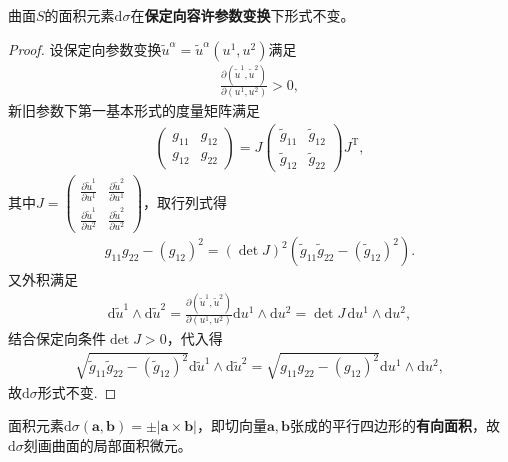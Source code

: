 \documentclass[../../main.tex]{subfiles}%
\begin{document}
\begin{proposition}
曲面$S$的面积元素$\mathrm{d}\sigma$在\textbf{保定向容许参数变换}下形式不变。
\end{proposition}
\begin{proof}
设保定向参数变换$\tilde{u}^\alpha=\tilde{u}^\alpha(u^1,u^2)$满足
\begin{align*}
\frac{\partial(\tilde{u}^1,\tilde{u}^2)}{\partial(u^1,u^2)}>0,
\end{align*}
新旧参数下第一基本形式的度量矩阵满足
\begin{align*}
\begin{pmatrix}g_{11}&g_{12}\\g_{12}&g_{22}\end{pmatrix}=J\begin{pmatrix}\tilde{g}_{11}&\tilde{g}_{12}\\\tilde{g}_{12}&\tilde{g}_{22}\end{pmatrix}J^\mathrm{T},
\end{align*}
其中$J=\begin{pmatrix}\frac{\partial\tilde{u}^1}{\partial u^1}&\frac{\partial\tilde{u}^2}{\partial u^1}\\\frac{\partial\tilde{u}^1}{\partial u^2}&\frac{\partial\tilde{u}^2}{\partial u^2}\end{pmatrix}$，取行列式得
\begin{align*}
g_{11}g_{22}-(g_{12})^2=(\det J)^2(\tilde{g}_{11}\tilde{g}_{22}-(\tilde{g}_{12})^2).
\end{align*}
又外积满足
\begin{align*}
\mathrm{d}\tilde{u}^1\wedge\mathrm{d}\tilde{u}^2=\frac{\partial(\tilde{u}^1,\tilde{u}^2)}{\partial(u^1,u^2)}\mathrm{d}u^1\wedge\mathrm{d}u^2=\det J\,\mathrm{d}u^1\wedge\mathrm{d}u^2,
\end{align*}
结合保定向条件$\det J>0$，代入得
\begin{align*}
\sqrt{\tilde{g}_{11}\tilde{g}_{22}-(\tilde{g}_{12})^2}\mathrm{d}\tilde{u}^1\wedge\mathrm{d}\tilde{u}^2=\sqrt{g_{11}g_{22}-(g_{12})^2}\mathrm{d}u^1\wedge\mathrm{d}u^2,
\end{align*}
故$\mathrm{d}\sigma$形式不变.
\end{proof}

\begin{remark}
面积元素$\mathrm{d}\sigma(\boldsymbol{a},\boldsymbol{b})=\pm|\boldsymbol{a}\times\boldsymbol{b}|$，即切向量$\boldsymbol{a},\boldsymbol{b}$张成的平行四边形的\textbf{有向面积}，故$\mathrm{d}\sigma$刻画曲面的局部面积微元。
\end{remark}
\end{document}
